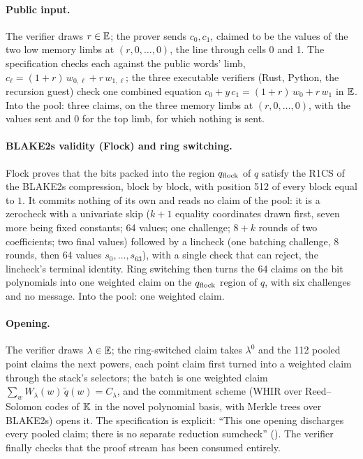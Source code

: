 \paragraph{Public input.} The verifier draws $r \in \mathbb{E}$; the prover sends $c_0, c_1$, claimed
to be the values of the two low memory limbs at $(r, 0, \dots, 0)$, the line through cells
0 and 1. The specification checks each against the public words' limb,
$c_\ell = (1 + r)\, w_{0,\ell} + r\, w_{1,\ell}$; the three executable verifiers (Rust, Python,
the recursion guest) check one combined equation $c_0 + y\, c_1 = (1 + r)\, w_0 + r\, w_1$ in
$\mathbb{E}$. Into the pool: three claims, on the three memory limbs at $(r, 0, \dots, 0)$, with the
values sent and $0$ for the top limb, for which nothing is sent.

\paragraph{BLAKE2s validity (Flock) and ring switching.} Flock proves that the bits packed into
the region $q_{\mathrm{flock}}$ of $q$ satisfy the R1CS of the BLAKE2s compression, block by block, with
position 512 of every block equal to $1$. It commits nothing of its own and reads no claim of
the pool: it is a zerocheck with a univariate skip ($k + 1$ equality coordinates drawn first, seven
more being fixed constants; 64 values; one challenge; $8 + k$ rounds of two coefficients; two
final values) followed by a lincheck (one batching challenge, $8$ rounds, then 64 values
$s_0, \dots, s_{63}$), with a single check that can reject, the lincheck's terminal identity.
Ring switching then turns the 64 claims on the bit polynomials into one weighted claim on the
$q_{\mathrm{flock}}$ region of $q$, with six challenges and no message. Into the pool: one weighted claim.

\paragraph{Opening.} The verifier draws $\lambda \in \mathbb{E}$; the ring-switched claim takes
$\lambda^0$ and the 112 pooled point claims the next powers, each point claim first turned
into a weighted claim through the stack's selectors; the batch is one weighted claim
$\sum_w W_\lambda(w)\, \widetilde{q}(w) = C_\lambda$, and the commitment scheme (WHIR over
Reed--Solomon codes of $\mathbb{K}$ in the novel polynomial basis, with Merkle trees over BLAKE2s)
opens it. The specification is explicit: \enquote{This one opening discharges every pooled
claim; there is no separate reduction sumcheck}
(). The verifier finally checks that the
proof stream has been consumed entirely.

